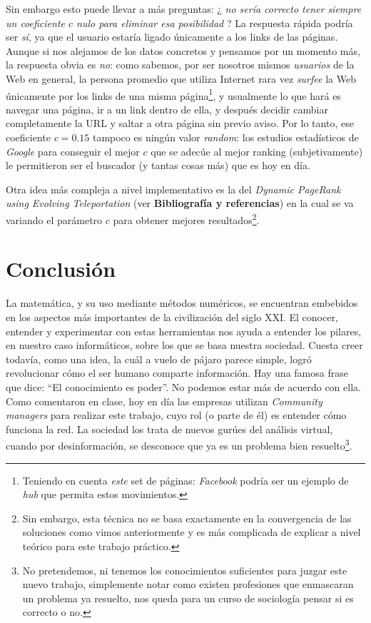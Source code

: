 \vspace{\baselineskip}
Sin embargo esto puede llevar a más preguntas: ¿ \textit{no sería correcto tener siempre un coeficiente $c$ nulo para eliminar esa posibilidad} ? La respuesta rápida podría ser \textit{sí}, ya que el usuario estaría ligado únicamente a los links de las páginas. Aunque si nos alejamos de los datos concretos y pensamos por un momento más, la respuesta obvia es \textit{no}: como sabemos, por ser nosotros mismos \textit{usuarios} de la Web en general, la persona promedio que utiliza Internet rara vez \textit{surfee} la Web únicamente por los links de una misma página\footnote{Teniendo en cuenta \textit{este} set de páginas: \textit{Facebook} podría ser un ejemplo de \textit{hub} que permita estos movimientos.}, y usualmente lo que hará es navegar una página, ir a un link dentro de ella, y después decidir cambiar completamente la URL y saltar a otra página sin previo aviso. Por lo tanto, ese coeficiente $c = 0.15$ tampoco es ningún valor \textit{random}: los estudios estadísticos de \textit{Google} para conseguir el mejor $c$ que se adecúe al mejor ranking (subjetivamente) le permitieron ser el buscador (y tantas cosas más) que es hoy en día. 

Otra idea más compleja a nivel implementativo es la del \textit{Dynamic PageRank using Evolving Teleportation} (ver \textbf{Bibliografía y referencias}) en la cual se va variando el parámetro $c$ para obtener mejores resultados\footnote{Sin embargo, esta técnica no se basa exactamente en la convergencia de las soluciones como vimos anteriormente y es más complicada de explicar a nivel teórico para este trabajo práctico.}.

\section{Conclusión}

La matemática, y su uso mediante métodos numéricos, se encuentran embebidos en los aspectos más importantes de la civilización del siglo XXI. El conocer, entender y experimentar con estas herramientas nos ayuda a entender los pilares, en nuestro caso informáticos, sobre los que se basa nuestra sociedad. Cuesta creer todavía, como una idea, la cuál a vuelo de pájaro parece simple, logró revolucionar cómo el ser humano comparte información. Hay una famosa frase que dice: ``El conocimiento es poder''. No podemos estar más de acuerdo con ella. Como comentaron en clase, hoy en día las empresas utilizan \textit{Community managers} para realizar este trabajo, cuyo rol (o parte de él) es entender cómo funciona la red. La sociedad los trata de nuevos gurúes del análisis virtual, cuando por desinformación, se desconoce que ya es un problema bien resuelto\footnote{No pretendemos, ni tenemos los conocimientos suficientes para juzgar este nuevo trabajo, simplemente notar como existen profesiones que enmascaran un problema ya resuelto, nos queda para un curso de sociología pensar si es correcto o no.}.

